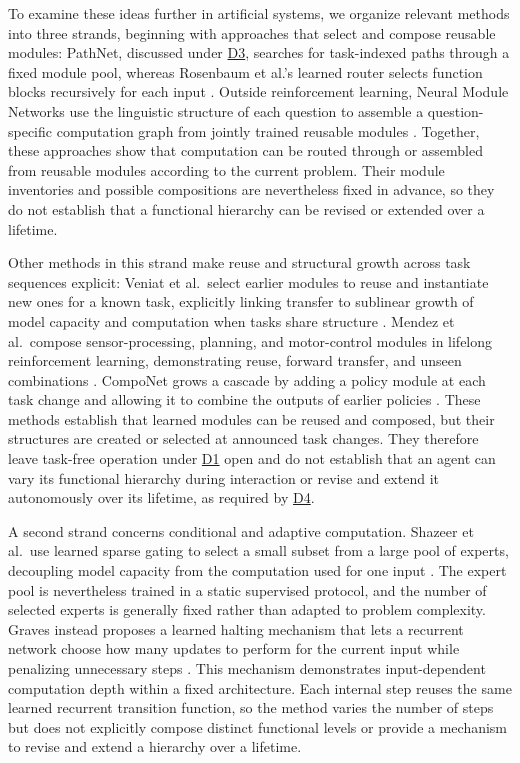 \documentclass[10pt,journal,compsoc]{IEEEtran}
\DeclareRobustCommand{\Dref}[1]{\hyperref[sec:d#1]{D#1}}
\begin{document}
To examine these ideas further in artificial systems, we organize relevant methods into three strands, beginning with approaches that select and compose reusable modules:
PathNet, discussed under \Dref{3}, searches for task-indexed paths through a fixed module pool, whereas Rosenbaum et al.'s learned router selects function blocks recursively for each input \cite{fernando2017,rosenbaum2018}.
Outside reinforcement learning, Neural Module Networks use the linguistic structure of each question to assemble a question-specific computation graph from jointly trained reusable modules \cite{andreas2016}.
Together, these approaches show that computation can be routed through or assembled from reusable modules according to the current problem.
Their module inventories and possible compositions are nevertheless fixed in advance, so they do not establish that a functional hierarchy can be revised or extended over a lifetime.

Other methods in this strand make reuse and structural growth across task sequences explicit:
Veniat et al.\ select earlier modules to reuse and instantiate new ones for a known task, explicitly linking transfer to sublinear growth of model capacity and computation when tasks share structure \cite{veniat2021}.
Mendez et al.\ compose sensor-processing, planning, and motor-control modules in lifelong reinforcement learning, demonstrating reuse, forward transfer, and unseen combinations \cite{mendez2022b}.
CompoNet grows a cascade by adding a policy module at each task change and allowing it to combine the outputs of earlier policies \cite{malagon2024}.
These methods establish that learned modules can be reused and composed, but their structures are created or selected at announced task changes.
They therefore leave task-free operation under \Dref{1} open and do not establish that an agent can vary its functional hierarchy during interaction or revise and extend it autonomously over its lifetime, as required by \Dref{4}.

A second strand concerns conditional and adaptive computation.
Shazeer et al.\ use learned sparse gating to select a small subset from a large pool of experts, decoupling model capacity from the computation used for one input \cite{shazeer2017}.
The expert pool is nevertheless trained in a static supervised protocol, and the number of selected experts is generally fixed rather than adapted to problem complexity.
Graves instead proposes a learned halting mechanism that lets a recurrent network choose how many updates to perform for the current input while penalizing unnecessary steps \cite{graves2016a}.
This mechanism demonstrates input-dependent computation depth within a fixed architecture.
Each internal step reuses the same learned recurrent transition function, so the method varies the number of steps but does not explicitly compose distinct functional levels or provide a mechanism to revise and extend a hierarchy over a lifetime.
\end{document}
